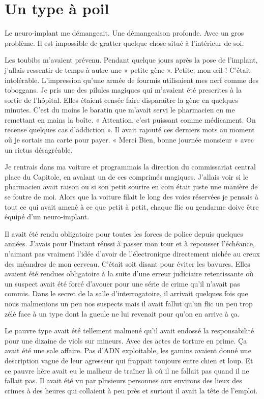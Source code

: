 \chapter{Un type à poil}

Le neuro-implant me démangeait. Une démangeaison profonde. Avec un gros problème. Il est impossible de gratter quelque
chose situé à l'intérieur de soi.

Les toubibs m'avaient prévenu. Pendant quelque jours après la pose de l'implant, j'allais ressentir de temps à autre
une « petite gène ». Petite, mon œil ! C'était intolérable. L'impression qu'une armée de fourmis utilisaient mes nerf
comme des toboggans. Je pris une des pilules magiques qui m'avaient été prescrites à la sortie de l'hôpital. Elles
étaient censée faire disparaître la gène en quelques minutes. C'est du moins le baratin que m'avait servi le
pharmacien en me remettant en mains la boîte. « Attention, c'est puissant comme médicament. On recense quelques cas
d'addiction ». Il avait rajouté ces derniers mots au moment où je sortais ma carte pour payer. « Merci Bien, bonne
journée monsieur » avec un rictus désagréable.

Je rentrais dans ma voiture et programmais la direction du commissariat central place du Capitole, en avalant un de ces
comprimés magiques. J'allais voir si le pharmacien avait raison ou si son petit sourire en coin était juste une manière
de se foutre de moi. Alors que la voiture filait le long des voies réservées je pensais à tout ce qui avait amené à ce
que petit à petit, chaque flic ou gendarme doive être équipé d'un neuro-implant.

Il avait été rendu obligatoire pour toutes les forces de police depuis quelques années. J'avais pour l'instant réussi à
passer mon tour et à repousser l'échéance, n'aimant pas vraiment l'idée d'avoir de l'électronique directement nichée au
creux des méandres de mon cerveau. C'était soit disant pour éviter les bavures. Elles avaient été rendues obligatoire à
la suite d'une erreur judiciaire retentissante où un suspect avait été forcé d'avouer pour une série de crime qu'il
n'avait pas commis. Dans le secret de la salle d'interrogatoire, il arrivait quelques fois que nous malmenions un peu
nos suspects mais il avait fallut qu'un flic un peu trop zélé face à un type dont la gueule ne lui revenait pour qu'on
en arrive à ça.

Le pauvre type avait été tellement malmené qu'il avait endossé la responsabilité pour une dizaine de viols sur mineurs.
Avec des actes de torture en prime. Ça avait été une sale affaire. Pas d'ADN exploitable, les gamins avaient donné une
description vague de leur agresseur qui frappait toujours entre chien et loup. Et ce pauvre hère avait eu le malheur de
traîner là où il ne fallait pas quand il ne fallait pas. Il avait été vu par plusieurs personnes aux environs des lieux
des crimes à des heures qui collaient à peu près et surtout il avait la tête de l'emploi.

